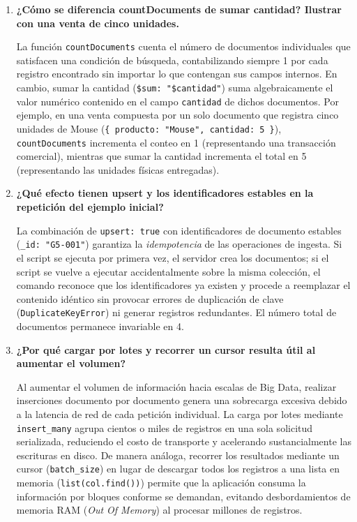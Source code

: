 \documentclass[12pt,a4paper]{article}
\begin{document}
\begin{enumerate}
    \item \textbf{¿Cómo se diferencia countDocuments de sumar cantidad? Ilustrar con una venta de cinco unidades.}
    
    La función \texttt{countDocuments} cuenta el número de documentos individuales que satisfacen una condición de búsqueda, contabilizando siempre 1 por cada registro encontrado sin importar lo que contengan sus campos internos. En cambio, sumar la cantidad (\texttt{\$sum: "\$cantidad"}) suma algebraicamente el valor numérico contenido en el campo \texttt{cantidad} de dichos documentos. Por ejemplo, en una venta compuesta por un solo documento que registra cinco unidades de Mouse (\texttt{\{ producto: "Mouse", cantidad: 5 \}}), \texttt{countDocuments} incrementa el conteo en 1 (representando una transacción comercial), mientras que sumar la cantidad incrementa el total en 5 (representando las unidades físicas entregadas).

    \item \textbf{¿Qué efecto tienen upsert y los identificadores estables en la repetición del ejemplo inicial?}
    
    La combinación de \texttt{upsert: true} con identificadores de documento estables (\texttt{\_id: "G5-001"}) garantiza la \textit{idempotencia} de las operaciones de ingesta. Si el script se ejecuta por primera vez, el servidor crea los documentos; si el script se vuelve a ejecutar accidentalmente sobre la misma colección, el comando reconoce que los identificadores ya existen y procede a reemplazar el contenido idéntico sin provocar errores de duplicación de clave (\texttt{DuplicateKeyError}) ni generar registros redundantes. El número total de documentos permanece invariable en 4.

    \item \textbf{¿Por qué cargar por lotes y recorrer un cursor resulta útil al aumentar el volumen?}
    
    Al aumentar el volumen de información hacia escalas de Big Data, realizar inserciones documento por documento genera una sobrecarga excesiva debido a la latencia de red de cada petición individual. La carga por lotes mediante \texttt{insert\_many} agrupa cientos o miles de registros en una sola solicitud serializada, reduciendo el costo de transporte y acelerando sustancialmente las escrituras en disco. De manera análoga, recorrer los resultados mediante un cursor (\texttt{batch\_size}) en lugar de descargar todos los registros a una lista en memoria (\texttt{list(col.find())}) permite que la aplicación consuma la información por bloques conforme se demandan, evitando desbordamientos de memoria RAM (\textit{Out Of Memory}) al procesar millones de registros.


\end{enumerate}
\end{document}
